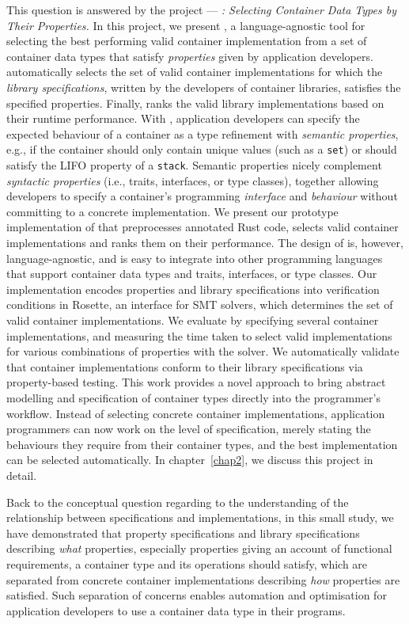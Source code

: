 This question is answered by the project --- \emph{\Primrose{}: Selecting Container Data Types by Their Properties.}
In this project, we present \Primrose{}, a language-agnostic tool for selecting the best performing valid container implementation from a set of container data types that satisfy \emph{properties} given by application developers.
\Primrose{} automatically selects the set of valid container implementations for which the \emph{library specifications}, written by the developers of container libraries, satisfies the specified properties.
Finally, \Primrose{} ranks the valid library implementations based on their runtime performance.
With \Primrose{}, application developers can specify the expected behaviour of a container as a type refinement with \emph{semantic properties}, e.g., if the container should only contain unique values (such as a \lstinline{set}) or should satisfy the LIFO property of a \lstinline{stack}.
Semantic properties nicely complement \emph{syntactic properties} (i.e., traits, interfaces, or type classes), together allowing developers to specify a container's programming \emph{interface} and \emph{behaviour} without committing to a concrete implementation.
We present our prototype implementation of \Primrose{} that preprocesses annotated Rust code, selects valid container implementations and ranks them on their performance. The design of \Primrose{} is, however, language-agnostic, and is easy to integrate into other programming languages that support container data types and traits, interfaces, or type classes. Our implementation encodes properties and library specifications into verification conditions in Rosette, an interface for SMT solvers, which determines the set of valid container implementations. We evaluate \Primrose{} by specifying several container implementations, and measuring the time taken to select valid implementations for various combinations of properties with the solver. We automatically validate that container implementations conform to their library specifications via property-based testing.
This work provides a novel approach to bring abstract modelling and specification of container types directly into the programmer's workflow.
Instead of selecting concrete container implementations, application programmers can now work on the level of specification, merely stating the behaviours they require from their container types, and the best implementation can be selected automatically. In chapter~\ref{chap2}, we discuss this project in detail.

Back to the conceptual question regarding to the understanding of the relationship between specifications and implementations, in this small study, we have demonstrated that property specifications and library specifications describing \emph{what} properties, especially properties giving an account of functional requirements, a container type and its operations should satisfy, which are separated from concrete container implementations describing \emph{how} properties are satisfied. Such separation of concerns enables automation and optimisation for application developers to use a container data type in their programs.

